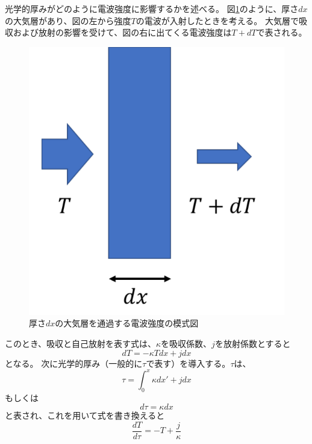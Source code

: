 光学的厚みがどのように電波強度に影響するかを述べる。
図\ref{fig:depth_dx}のように、厚さ$dx$の大気層があり、図の左から強度$T$の電波が入射したときを考える。
大気層で吸収および放射の影響を受けて、図の右に出てくる電波強度は$T+dT$で表される。
\begin{figure}[htbp]
    \centering
    \includegraphics[width=\linewidth]{master_thesis_contents/master_thesis_fig/depth_dx.pdf}
    \caption{厚さ$dx$の大気層を通過する電波強度の模式図}
    \label{fig:depth_dx}
\end{figure}
このとき、吸収と自己放射を表す式は、$\kappa$を吸収係数、$j$を放射係数とすると
\begin{equation}
    dT = -\kappa T dx + j dx
    \label{eq:absorption_selfemission_1}
\end{equation}
となる。
次に光学的厚み（一般的に$\tau$で表す）を導入する。$\tau$は、
\begin{equation}
    \tau = \int_{0}^{x} \kappa dx' + j dx
\end{equation}
もしくは
\begin{equation}
    d\tau = \kappa dx
\end{equation}
と表され、これを用いて式を書き換えると
\begin{equation}
    \frac{dT}{d\tau} = -T + \frac{j}{\kappa}
    \label{eq:absorption_selfemission_4}
\end{equation}
